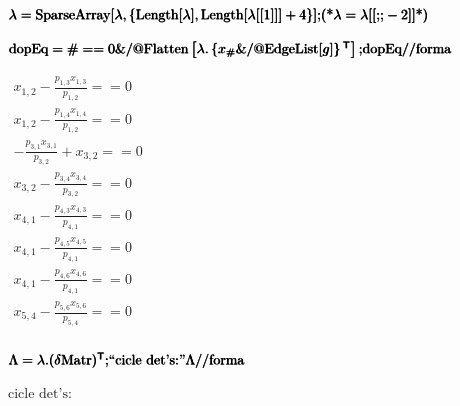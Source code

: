 \documentclass{article}
\begin{document}
\begin{doublespace}
\noindent\(\pmb{\lambda =\text{SparseArray}[\lambda ,\{\text{Length}[\lambda ],\text{Length}[\lambda [[1]]]+4\}];}\\
\pmb{\text{(*}\lambda =\lambda [[\text{;;}-2]]\text{*)}}\)
\end{doublespace}

\begin{doublespace}
\noindent\(\pmb{\text{dopEq}=\#==0\&\text{/@}\text{Flatten}\left[\lambda .\left\{x_{\#}\&\text{/@}\text{EdgeList}[g]\right\}{}^{\mathsf{T}}\right];}\\
\pmb{\text{dopEq}\text{//}\text{forma}}\)
\end{doublespace}

\begin{doublespace}
\noindent\(\begin{array}{l}
 x_{1,2}-\frac{p_{1,3} x_{1,3}}{p_{1,2}}==0 \\
 x_{1,2}-\frac{p_{1,4} x_{1,4}}{p_{1,2}}==0 \\
 -\frac{p_{3,1} x_{3,1}}{p_{3,2}}+x_{3,2}==0 \\
 x_{3,2}-\frac{p_{3,4} x_{3,4}}{p_{3,2}}==0 \\
 x_{4,1}-\frac{p_{4,3} x_{4,3}}{p_{4,1}}==0 \\
 x_{4,1}-\frac{p_{4,5} x_{4,5}}{p_{4,1}}==0 \\
 x_{4,1}-\frac{p_{4,6} x_{4,6}}{p_{4,1}}==0 \\
 x_{5,4}-\frac{p_{5,6} x_{5,6}}{p_{5,4}}==0 \\
\end{array}\)
\end{doublespace}

\begin{doublespace}
\noindent\(\pmb{\Lambda =\lambda .(\text{$\delta $Matr})^{\mathsf{T}};}\\
\pmb{\text{{``}cicle det's:{''}}}\\
\pmb{\Lambda \text{//}\text{forma}}\)
\end{doublespace}

\begin{doublespace}
\noindent\(\text{cicle det's:}\)
\end{doublespace}
\end{document}

